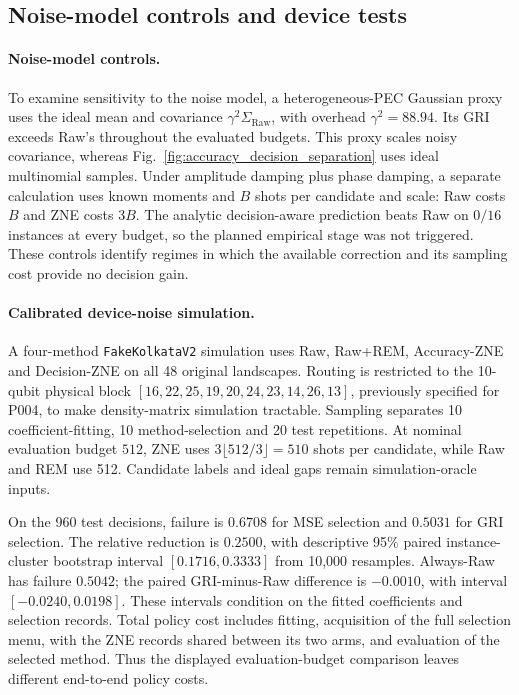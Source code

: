 \documentclass[a4paper,onecolumn,unpublished,nopdfoutputerror]{quantumarticle}
\theoremstyle{plain}
\theoremstyle{definition}
\newcommand{\Raw}{\mathrm{Raw}}
\newcommand{\1}{\mathbf{1}}
\begin{document}
\subsection{Noise-model controls and device tests}

\paragraph{Noise-model controls.}
To examine sensitivity to the noise model, a heterogeneous-PEC Gaussian proxy uses the ideal mean and covariance $\gamma^2\Sigma_{\Raw}$, with overhead $\gamma^2=88.94$. Its GRI exceeds Raw's throughout the evaluated budgets. This proxy scales noisy covariance, whereas Fig.~\ref{fig:accuracy_decision_separation} uses ideal multinomial samples. Under amplitude damping plus phase damping, a separate calculation uses known moments and $B$ shots per candidate and scale: Raw costs $B$ and ZNE costs $3B$. The analytic decision-aware prediction beats Raw on $0/16$ instances at every budget, so the planned empirical stage was not triggered. These controls identify regimes in which the available correction and its sampling cost provide no decision gain.

\paragraph{Calibrated device-noise simulation.}
A four-method \texttt{FakeKolkataV2} simulation uses Raw, Raw+REM, Accuracy-ZNE and Decision-ZNE on all 48 original landscapes. Routing is restricted to the 10-qubit physical block $[16,22,25,19,20,24,23,14,26,13]$, previously specified for P004, to make density-matrix simulation tractable. Sampling separates 10 coefficient-fitting, 10 method-selection and 20 test repetitions. At nominal evaluation budget $512$, ZNE uses $3\lfloor512/3\rfloor=510$ shots per candidate, while Raw and REM use 512. Candidate labels and ideal gaps remain simulation-oracle inputs.

On the 960 test decisions, failure is $0.6708$ for MSE selection and $0.5031$ for GRI selection. The relative reduction is $0.2500$, with descriptive 95\% paired instance-cluster bootstrap interval $[0.1716,0.3333]$ from 10,000 resamples. Always-Raw has failure $0.5042$; the paired GRI-minus-Raw difference is $-0.0010$, with interval $[-0.0240,0.0198]$. These intervals condition on the fitted coefficients and selection records. Total policy cost includes fitting, acquisition of the full selection menu, with the ZNE records shared between its two arms, and evaluation of the selected method. Thus the displayed evaluation-budget comparison leaves different end-to-end policy costs.
\end{document}
